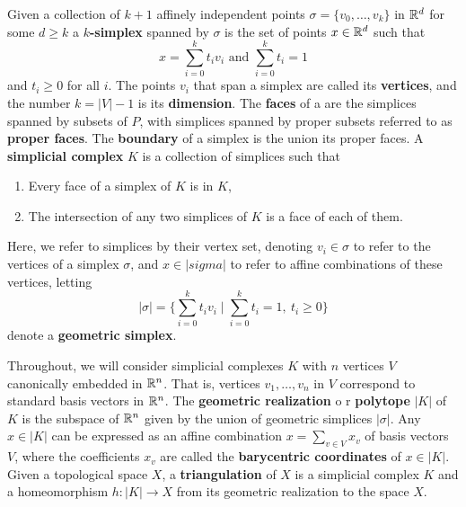 
%
Given a collection of $k+1$ affinely independent points $\sigma = \{v_0,\ldots,v_k\}$ in $\mathbb{R}^d$ for some $d\geq k$ a \textbf{$k$-simplex} spanned by $\sigma$ is the set of points $x\in\mathbb{R}^d$ such that
\[ x = \sum_{i=0}^k t_i v_i\text{ and }\sum_{i=0}^k t_i = 1\]
and $t_i\geq 0$ for all $i$.
The points $v_i$ that span a simplex are called its \textbf{vertices}, and the number $k = |V| - 1$ is its \textbf{dimension}.
The \textbf{faces} of a are the simplices spanned by subsets of $P$, with simplices spanned by proper subsets referred to as \textbf{proper faces}.
The \textbf{boundary} of a simplex is the union its proper faces.
A \textbf{simplicial complex} $K$ is a collection of simplices such that
\begin{enumerate}
  \item Every face of a simplex of $K$ is in $K$,
  \item The intersection of any two simplices of $K$ is a face of each of them.
\end{enumerate}
Here, we refer to simplices by their vertex set, denoting $v_i\in\sigma$ to refer to the vertices of a simplex $\sigma$, and $x\in |sigma|$ to refer to affine combinations of these vertices, letting
\[ |\sigma| = \{ \sum_{i=0}^k t_i v_i\mid \sum_{i=0}^k t_i = 1,\ t_i\geq 0\}\]
denote a \textbf{geometric simplex}.

Throughout, we will consider simplicial complexes $K$ with $n$ vertices $V$ canonically embedded in $\mathbb{R}^n$.
That is, vertices $v_1,\ldots, v_n$ in $V$ correspond to standard basis vectors in $\mathbb{R}^n$.
The \textbf{geometric realization} o r \textbf{polytope} $|K|$ of $K$ is the subspace of $\mathbb{R}^n$ given by the union of geometric simplices $|\sigma|$.
Any $x\in |K|$ can be expressed as an affine combination $x = \sum_{v\in V} x_v$ of basis vectors $V$, where the coefficients $x_v$ are called the \textbf{barycentric coordinates} of $x\in |K|$.
Given a topological space $X$, a \textbf{triangulation} of $X$ is a simplicial complex $K$ and a homeomorphism $h : |K|\to X$ from its geometric realization to the space $X$.
